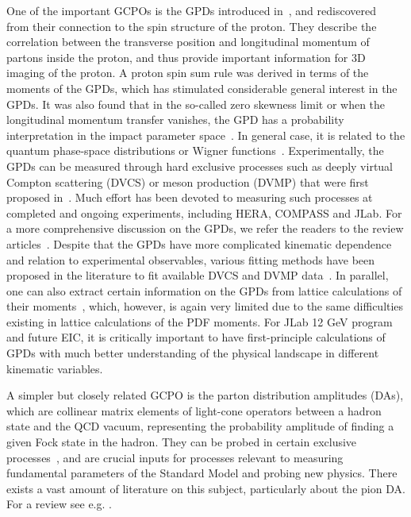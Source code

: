 \documentclass[aps,rmp,reprint,amsmath,amssymb,graphicx,longbibliography]{revtex4-1} %
\begin{document}
One of the important GCPOs is the GPDs introduced in~\cite{Mueller:1998fv}, and
rediscovered~\cite{Ji:1996ek} from their connection to the spin structure of the proton.
%
They describe the correlation between the transverse position and longitudinal momentum of partons inside the proton, and thus provide important information for 3D imaging of the proton. A proton spin sum rule was derived in terms of the moments of the GPDs, which has
stimulated considerable general interest in the GPDs. It was also found that
in the so-called zero skewness limit or when the longitudinal momentum transfer
vanishes, the GPD has a probability interpretation in the impact parameter space~\cite{Burkardt:2000za}.
%
In general case, it is related to the quantum phase-space distributions or Wigner functions~\cite{Ji:2003ak,Belitsky:2003nz}.
Experimentally, the GPDs can be measured through hard exclusive processes such as deeply virtual Compton scattering (DVCS) or meson production (DVMP) that were first proposed in~\cite{Ji:1996ek,Ji:1996nm}. Much effort has been devoted to measuring such processes at completed and ongoing experiments, including HERA, COMPASS and JLab. For a more comprehensive discussion on the GPDs, we refer the readers to the review articles~\cite{Ji:1998pc,Ji:2004gf,Diehl:2003ny,Belitsky:2005qn}.
%
Despite that the GPDs have more complicated kinematic dependence and relation to experimental observables,
various fitting methods have been proposed in the literature to fit available DVCS and DVMP data~\cite{Kumericki:2016ehc,Favart:2015umi}. In parallel, one can also extract certain information on the GPDs from lattice calculations of their moments~\cite{Hagler:2007xi,Gockeler:2003jfa,Alexandrou:2019ali}, which, however, is again very limited due to the same difficulties existing in lattice calculations of the PDF moments. For JLab 12 GeV program and future EIC, it
is critically important to have first-principle calculations of GPDs with much better understanding
of the physical landscape in different kinematic variables.


A simpler but closely related GCPO is the parton distribution amplitudes (DAs), which are collinear matrix elements of light-cone operators between a hadron state and the QCD vacuum, representing the probability amplitude of finding a given Fock state in the hadron. They can be probed in certain exclusive processes~\cite{Brodsky:2002st}, and are crucial inputs for processes relevant to measuring fundamental parameters of the Standard Model and probing new physics. There exists a vast amount of literature on this subject, particularly about the pion DA. For a review see e.g. \cite{Brodsky:1989pv,Grozin:2005iz,Braun:2006hn}.
\end{document}
